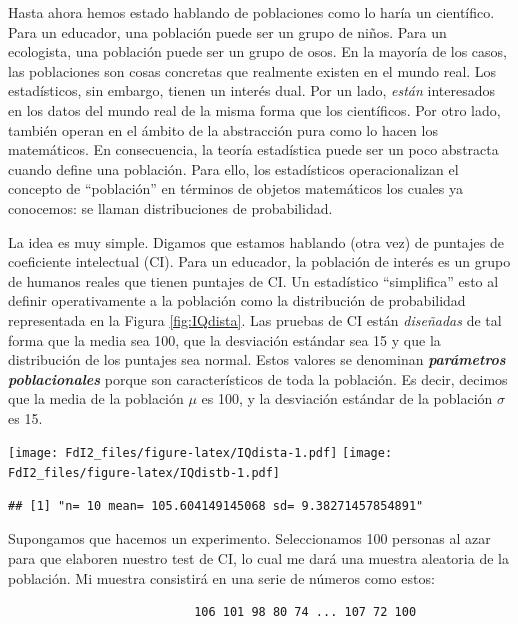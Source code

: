 \documentclass[spanish,]{book}
\begin{document}
Hasta ahora hemos estado hablando de poblaciones como lo haría un
científico. Para un educador, una población puede ser un grupo de niños.
Para un ecologista, una población puede ser un grupo de osos. En la
mayoría de los casos, las poblaciones son cosas concretas que realmente
existen en el mundo real. Los estadísticos, sin embargo, tienen un
interés dual. Por un lado, \emph{están} interesados en los datos del
mundo real de la misma forma que los científicos. Por otro lado, también
operan en el ámbito de la abstracción pura como lo hacen los
matemáticos. En consecuencia, la teoría estadística puede ser un poco
abstracta cuando define una población. Para ello, los estadísticos
operacionalizan el concepto de ``población'' en términos de objetos
matemáticos los cuales ya conocemos: se llaman distribuciones de
probabilidad.

La idea es muy simple. Digamos que estamos hablando (otra vez) de
puntajes de coeficiente intelectual (CI). Para un educador, la población
de interés es un grupo de humanos reales que tienen puntajes de CI. Un
estadístico ``simplifica'' esto al definir operativamente a la población
como la distribución de probabilidad representada en la Figura
\ref{fig:IQdista}. Las pruebas de CI están \emph{diseñadas} de tal forma
que la media sea 100, que la desviación estándar sea 15 y que la
distribución de los puntajes sea normal. Estos valores se denominan
\textbf{\emph{parámetros poblacionales}} porque son característicos de
toda la población. Es decir, decimos que la media de la población
\(\mu\) es 100, y la desviación estándar de la población \(\sigma\) es
15.

\texttt{[image: FdI2\_files/figure-latex/IQdista-1.pdf]}
\texttt{[image: FdI2\_files/figure-latex/IQdistb-1.pdf]}

\begin{verbatim}
## [1] "n= 10 mean= 105.604149145068 sd= 9.38271457854891"
\end{verbatim}

Supongamos que hacemos un experimento. Seleccionamos 100 personas al
azar para que elaboren nuestro test de CI, lo cual me dará una muestra
aleatoria de la población. Mi muestra consistirá en una serie de números
como estos:

\begin{verbatim}
                          106 101 98 80 74 ... 107 72 100
\end{verbatim}
\end{document}
